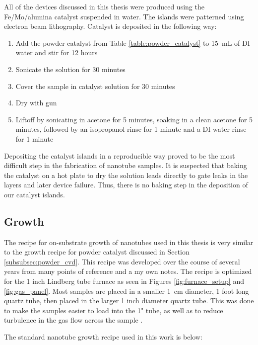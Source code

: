 All of the devices discussed in this thesis were produced using the Fe\slash Mo\slash alumina catalyst suspended in water. The islands were patterned using electron beam lithography. Catalyst is deposited in the following way:

\begin{enumerate}
	\item Add the powder catalyst from Table \ref{table:powder_catalyst} to \SI{15}{\milli\liter} of DI water and stir for 12 hours
	\item Sonicate the solution for 30 minutes
	\item Cover the sample in catalyst solution for 30 minutes
	\item Dry with  gun
	\item Liftoff by sonicating in acetone for 5 minutes, soaking in a clean acetone for 5 minutes, followed by an isopropanol rinse for 1 minute and a DI water rinse for 1 minute
\end{enumerate}

Depositing the catalyst islands in a reproducible way proved to be the most difficult step in the fabrication of nanotube samples. It is suspected that baking the catalyst on a hot plate to dry the solution leads directly to gate leaks in the  layers and later device failure. Thus, there is no baking step in the deposition of our catalyst islands.

\subsection{Growth}
\label{subsubsec:substrate_cvd}

The recipe for on-substrate growth of nanotubes used in this thesis is very similar to the growth recipe for powder catalyst discussed in Section \ref{subsubsec:powder_cvd}. This recipe was developed over the course of several years from many points of reference \cite{Kong1998, Kong1998a, Dirks2010, Huang2003, Huang2004, Zhang2013, Hong2005} and a my own notes. The recipe is optimized for the 1 inch Lindberg tube furnace as seen in Figures \ref{fig:furnace_setup} and \ref{fig:gas_panel}. Most samples are placed in a smaller \SI{1}{\centi\meter} diameter, 1 foot long quartz tube, then placed in the larger 1 inch diameter quartz tube. This was done to make the samples easier to load into the 1" tube, as well as to reduce turbulence in the gas flow across the sample \cite{Hong2005}. 

The standard nanotube growth recipe used in this work is below:

